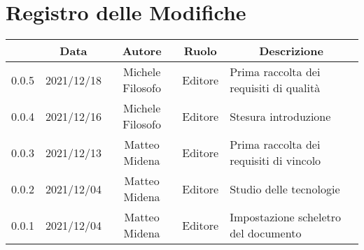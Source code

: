 \thispagestyle{empty}
\section*{Registro delle Modifiche}

\begin{center}
	\renewcommand{\arraystretch}{1.8}
	\begin{longtable}[c]{c | c | c | c | p{5cm}}
		\rowcolor[HTML]{125E28}
		\multicolumn{1}{c}{\color[HTML]{FFFFFF} \textbf{Versione}} & 
		\multicolumn{1}{c}{\color[HTML]{FFFFFF} \textbf{Data}} & 
		\multicolumn{1}{c}{\color[HTML]{FFFFFF} \textbf{Autore}} & 
		\multicolumn{1}{c}{\color[HTML]{FFFFFF} \textbf{Ruolo}} & 
		\multicolumn{1}{c}{\color[HTML]{FFFFFF} \textbf{Descrizione}} \\
		\endhead
		0.0.5 & 2021/12/18 & Michele Filosofo & Editore & Prima raccolta dei requisiti di qualità \\
		0.0.4 & 2021/12/16 & Michele Filosofo & Editore & Stesura introduzione \\
		0.0.3 & 2021/12/13 & Matteo Midena & Editore & Prima raccolta dei requisiti di vincolo\\
		0.0.2 & 2021/12/04 & Matteo Midena & Editore & Studio delle tecnologie\\
		0.0.1 & 2021/12/04 & Matteo Midena & Editore & Impostazione scheletro del documento\\
	\end{longtable}
\end{center}